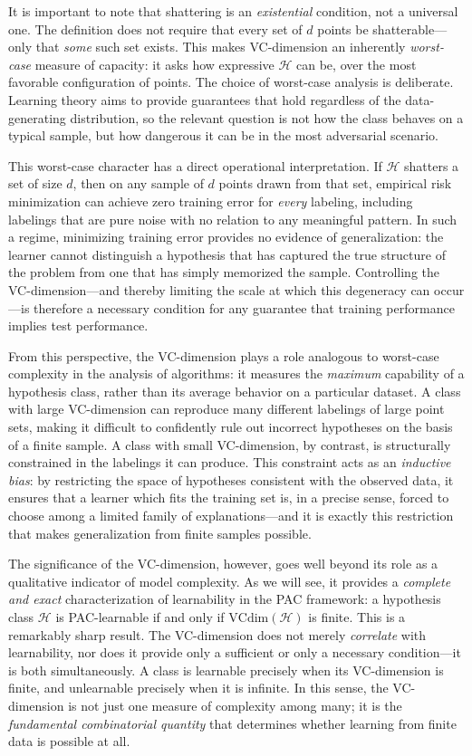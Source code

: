 It is important to note that shattering is an \emph{existential} condition, not a universal
one. The definition does not require that every set of $d$ points be shatterable---only that
\emph{some} such set exists. This makes VC-dimension an inherently \emph{worst-case} measure
of capacity: it asks how expressive $\mathcal{H}$ can be, over the most favorable configuration
of points. The choice of worst-case analysis is deliberate. Learning theory aims to provide
guarantees that hold regardless of the data-generating distribution, so the relevant question
is not how the class behaves on a typical sample, but how dangerous it can be in the most
adversarial scenario.

This worst-case character has a direct operational interpretation. If $\mathcal{H}$ shatters a
set of size $d$, then on any sample of $d$ points drawn from that set, empirical risk
minimization can achieve zero training error for \emph{every} labeling, including labelings
that are pure noise with no relation to any meaningful pattern. In such a regime, minimizing
training error provides no evidence of generalization: the learner cannot distinguish a
hypothesis that has captured the true structure of the problem from one that has simply
memorized the sample. Controlling the VC-dimension---and thereby limiting the scale at which
this degeneracy can occur---is therefore a necessary condition for any guarantee that training
performance implies test performance.

From this perspective, the VC-dimension plays a role analogous to worst-case complexity in the
analysis of algorithms: it measures the \emph{maximum} capability of a hypothesis class, rather
than its average behavior on a particular dataset. A class with large VC-dimension can reproduce
many different labelings of large point sets, making it difficult to confidently rule out
incorrect hypotheses on the basis of a finite sample. A class with small VC-dimension, by
contrast, is structurally constrained in the labelings it can produce. This constraint acts as
an \emph{inductive bias}: by restricting the space of hypotheses consistent with the observed
data, it ensures that a learner which fits the training set is, in a precise sense, forced to
choose among a limited family of explanations---and it is exactly this restriction that makes
generalization from finite samples possible.

The significance of the VC-dimension, however, goes well beyond its role as a qualitative
indicator of model complexity. As we will see, it provides a \emph{complete and exact}
characterization of learnability in the PAC framework: a hypothesis class $\mathcal{H}$ is
PAC-learnable if and only if $\mathrm{VCdim}(\mathcal{H})$ is finite. This is a remarkably
sharp result. The VC-dimension does not merely \emph{correlate} with learnability, nor does it
provide only a sufficient or only a necessary condition---it is both simultaneously. A class is
learnable precisely when its VC-dimension is finite, and unlearnable precisely when it is
infinite. In this sense, the VC-dimension is not just one measure of complexity among many; it
is the \emph{fundamental combinatorial quantity} that determines whether learning from finite
data is possible at all.

